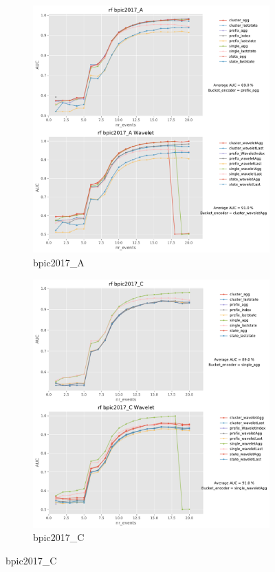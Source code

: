 \documentclass[twoside,11pt]{Latex/Classes/PhDthesisPSnPDF}
\begin{document}
\begin{figure}[!htbp] %
	
	\begin{subfigure}{0.48\textwidth}
		\includegraphics[width=\linewidth]{images/wavelet/graphs2rf/bpic2017_A.pdf}
		\caption{bpic2017\_A} 
	\end{subfigure}\hspace*{\fill}
	\begin{subfigure}{0.48\textwidth}
		\includegraphics[width=\linewidth]{images/wavelet/graphs2rf/bpic2017_C.pdf}
		\caption{bpic2017\_C}
	\end{subfigure}
	

\end{figure}
\end{document}
